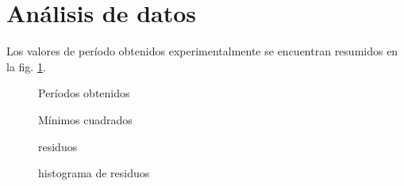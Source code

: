 \section{Análisis de datos}


Los valores de período obtenidos experimentalmente se encuentran resumidos en
la fig. \ref{fig:datos:periodos}.

\begin{figure}[H]
    \centering
    
    \caption{Períodos obtenidos}
    \label{fig:datos:periodos}
\end{figure}

\begin{figure}[H]
    \centering
    
    \caption{Mínimos cuadrados}
    \label{fig:datos:regresion}
\end{figure}

\begin{figure}[H]
    \centering
    
    \caption{residuos}
    \label{fig:datos:residuos}
\end{figure}

\begin{figure}[H]
    \centering
    
    \caption{histograma de residuos}
    \label{fig:datos:histograma}
\end{figure}
